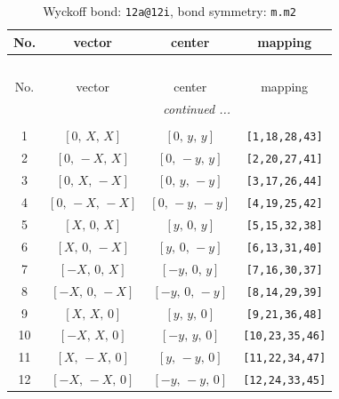 \documentclass[fleqn,8pt]{jsarticle}
\begin{document}
\begin{longtable}{cccc}
\caption{Wyckoff bond: {\tt 12a@12i}, bond symmetry: {\tt m.m2}}
 \\
 \hline \hline
No. & vector & center & mapping \\ \hline \endfirsthead

\multicolumn{3}{l}{\tablename\ \thetable{}} \\
 \hline \hline
No. & vector & center & mapping \\ \hline \endhead

 \hline \hline
\multicolumn{3}{r}{\footnotesize\it continued ...} \\ \endfoot

 \hline \hline
\multicolumn{3}{r}{} \\ \endlastfoot

1 & $\left[ 0,\, X,\, X \right]$ & $\left[ 0,\, y,\, y \right]$ & {\tt [1,18,28,43]} \\ \hline
2 & $\left[ 0,\, - X,\, X \right]$ & $\left[ 0,\, - y,\, y \right]$ & {\tt [2,20,27,41]} \\ \hline
3 & $\left[ 0,\, X,\, - X \right]$ & $\left[ 0,\, y,\, - y \right]$ & {\tt [3,17,26,44]} \\ \hline
4 & $\left[ 0,\, - X,\, - X \right]$ & $\left[ 0,\, - y,\, - y \right]$ & {\tt [4,19,25,42]} \\ \hline
5 & $\left[ X,\, 0,\, X \right]$ & $\left[ y,\, 0,\, y \right]$ & {\tt [5,15,32,38]} \\ \hline
6 & $\left[ X,\, 0,\, - X \right]$ & $\left[ y,\, 0,\, - y \right]$ & {\tt [6,13,31,40]} \\ \hline
7 & $\left[ - X,\, 0,\, X \right]$ & $\left[ - y,\, 0,\, y \right]$ & {\tt [7,16,30,37]} \\ \hline
8 & $\left[ - X,\, 0,\, - X \right]$ & $\left[ - y,\, 0,\, - y \right]$ & {\tt [8,14,29,39]} \\ \hline
9 & $\left[ X,\, X,\, 0 \right]$ & $\left[ y,\, y,\, 0 \right]$ & {\tt [9,21,36,48]} \\ \hline
10 & $\left[ - X,\, X,\, 0 \right]$ & $\left[ - y,\, y,\, 0 \right]$ & {\tt [10,23,35,46]} \\ \hline
11 & $\left[ X,\, - X,\, 0 \right]$ & $\left[ y,\, - y,\, 0 \right]$ & {\tt [11,22,34,47]} \\ \hline
12 & $\left[ - X,\, - X,\, 0 \right]$ & $\left[ - y,\, - y,\, 0 \right]$ & {\tt [12,24,33,45]} \\
\end{longtable}
\renewcommand{\arraystretch}{1.2}
\end{document}
